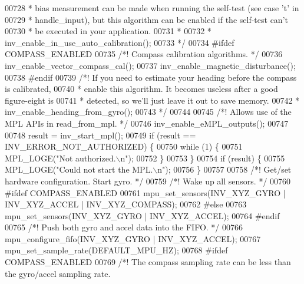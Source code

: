 \begin{DoxyCode}
{{{{{{{{00728 \textcolor{comment}{     * bias measurement can be made when running the self-test (see case 't' in}
00729 \textcolor{comment}{     * handle\_input), but this algorithm can be enabled if the self-test can't}
00730 \textcolor{comment}{     * be executed in your application.}
00731 \textcolor{comment}{     *}
00732 \textcolor{comment}{     * inv\_enable\_in\_use\_auto\_calibration();}
00733 \textcolor{comment}{     */}
00734 \textcolor{preprocessor}{#}\textcolor{preprocessor}{ifdef} \textcolor{preprocessor}{COMPASS\_ENABLED}
00735     \textcolor{comment}{/*! Compass calibration algorithms. */}
00736     inv\_enable\_vector\_compass\_cal();
00737     inv\_enable\_magnetic\_disturbance();
00738 \textcolor{preprocessor}{#}\textcolor{preprocessor}{endif}
00739     \textcolor{comment}{/*! If you need to estimate your heading before the compass is calibrated,}
00740 \textcolor{comment}{     * enable this algorithm. It becomes useless after a good figure-eight is}
00741 \textcolor{comment}{     * detected, so we'll just leave it out to save memory.}
00742 \textcolor{comment}{     * inv\_enable\_heading\_from\_gyro();}
00743 \textcolor{comment}{     */}
00744 
00745     \textcolor{comment}{/*! Allows use of the MPL APIs in read\_from\_mpl. */}
00746     inv\_enable\_eMPL\_outputs();
00747 
00748   result = inv\_start\_mpl();
00749   \textcolor{keywordflow}{if} (result == INV\_ERROR\_NOT\_AUTHORIZED) \{
00750       \textcolor{keywordflow}{while} (1) \{
00751           MPL\_LOGE(\textcolor{stringliteral}{"Not authorized.\(\backslash\)n"});
00752       \}
00753   \}
00754   \textcolor{keywordflow}{if} (result) \{
00755       MPL\_LOGE(\textcolor{stringliteral}{"Could not start the MPL.\(\backslash\)n"});
00756   \}
00757 
00758     \textcolor{comment}{/*! Get/set hardware configuration. Start gyro. */}
00759     \textcolor{comment}{/*! Wake up all sensors. */}
00760 \textcolor{preprocessor}{#}\textcolor{preprocessor}{ifdef} \textcolor{preprocessor}{COMPASS\_ENABLED}
00761     mpu\_set\_sensors(INV\_XYZ\_GYRO | INV\_XYZ\_ACCEL | INV\_XYZ\_COMPASS);
00762 \textcolor{preprocessor}{#}\textcolor{preprocessor}{else}
00763     mpu\_set\_sensors(INV\_XYZ\_GYRO | INV\_XYZ\_ACCEL);
00764 \textcolor{preprocessor}{#}\textcolor{preprocessor}{endif}
00765     \textcolor{comment}{/*! Push both gyro and accel data into the FIFO. */}
00766     mpu\_configure\_fifo(INV\_XYZ\_GYRO | INV\_XYZ\_ACCEL);
00767     mpu\_set\_sample\_rate(DEFAULT_MPU_HZ);
00768 \textcolor{preprocessor}{#}\textcolor{preprocessor}{ifdef} \textcolor{preprocessor}{COMPASS\_ENABLED}
00769     \textcolor{comment}{/*! The compass sampling rate can be less than the gyro/accel sampling rate.}
}}}}}}}}
\end{DoxyCode}
